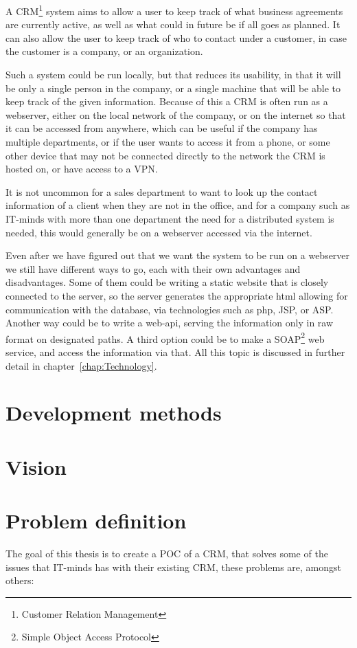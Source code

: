 A CRM\footnote{Customer Relation Management} system aims to allow a user to
keep track of what business agreements are currently active, as well as what
could in future be if all goes as planned. It can also allow the user to keep track of who
to contact under a customer, in case the customer is a company, or an organization.

Such a system could be run locally, but that reduces its usability, in that it will
be only a single person in the company, or a single machine that will be able to keep
track of the given information. Because of this a CRM is often run as a webserver, either
on the local network of the company, or on the internet so that it can be accessed
from anywhere, which can be useful if the company has multiple departments, or if the
user wants to access it from a phone, or some other device that may not be connected
directly to the network the CRM is hosted on, or have access to a VPN.

It is not uncommon for a sales department to want to look up the contact information
of a client when they are not in the office, and for a company such as IT-minds
with more than one department the need for a distributed system is needed, this would
generally be on a webserver accessed via the internet.

Even after we have figured out that we want the system to be run on a webserver we still have
different ways to go, each with their own advantages and disadvantages. Some of them
could be writing a static website that is closely connected to the server, so the server
generates the appropriate html allowing for communication with the database, via technologies
such as php, JSP, or ASP.
Another way could be to write a web-api, serving the information only in raw format
on designated paths. A third option could be to make a SOAP\footnote{Simple Object Access Protocol}
web service, and access the information via that.
All this topic is discussed in further detail in chapter~\ref{chap:Technology}.

\section{Development methods}
\label{sec:Development methods}


\section{Vision}
\label{sec:Vision}


\section{Problem definition}
\label{sec:Problem definition}
The goal of this thesis is to create a POC of a CRM, that solves some of the issues
that IT-minds has with their existing CRM, these problems are, amongst others:

